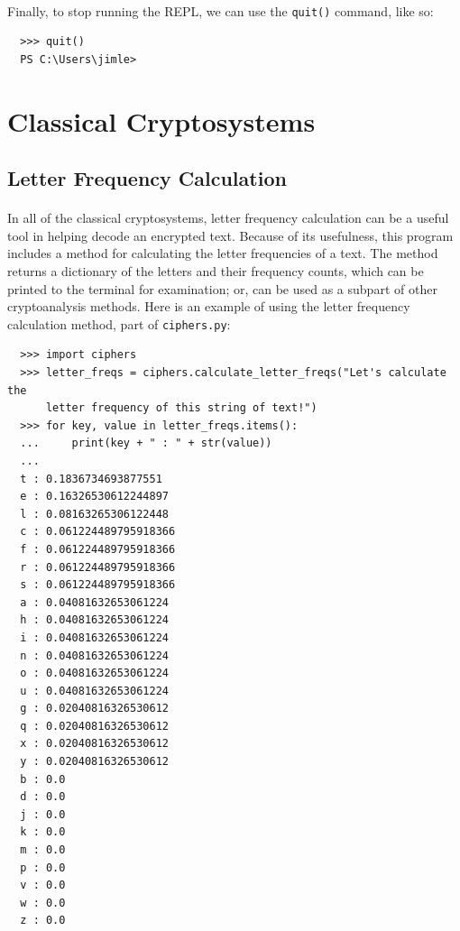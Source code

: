 \documentclass[12pt,a4paper]{article}
\begin{document}
\paragraph{}
Finally, to stop running the REPL, we can use the \verb|quit()| command, like so:

\begin{verbatim}
  >>> quit()
  PS C:\Users\jimle> 
\end{verbatim}


\section{Classical Cryptosystems}


\subsection{Letter Frequency Calculation}
\paragraph{}
In all of the classical cryptosystems, letter frequency calculation can be a 
useful tool in helping decode an encrypted text.  Because of its usefulness, 
this program includes a method for calculating the letter frequencies of a 
text.  The method returns a dictionary of the letters and their frequency 
counts, which can be printed to the terminal for examination; or, can be used 
as a subpart of other cryptoanalysis methods.  Here is an example of using the 
letter frequency calculation method, part of \verb|ciphers.py|:

\begin{verbatim}
  >>> import ciphers
  >>> letter_freqs = ciphers.calculate_letter_freqs("Let's calculate the 
      letter frequency of this string of text!")
  >>> for key, value in letter_freqs.items():
  ...     print(key + " : " + str(value))
  ... 
  t : 0.1836734693877551
  e : 0.16326530612244897
  l : 0.08163265306122448
  c : 0.061224489795918366
  f : 0.061224489795918366
  r : 0.061224489795918366
  s : 0.061224489795918366
  a : 0.04081632653061224
  h : 0.04081632653061224
  i : 0.04081632653061224
  n : 0.04081632653061224
  o : 0.04081632653061224
  u : 0.04081632653061224
  g : 0.02040816326530612
  q : 0.02040816326530612
  x : 0.02040816326530612
  y : 0.02040816326530612
  b : 0.0
  d : 0.0
  j : 0.0
  k : 0.0
  m : 0.0
  p : 0.0
  v : 0.0
  w : 0.0
  z : 0.0
\end{verbatim}
\end{document}

